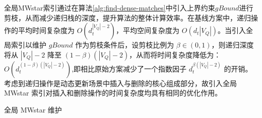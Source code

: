      全局MWstar索引通过在算法\ref{alg:find-dense-matches}中引入上界约束$gBound$进行剪枝，从而减少递归栈的深度，提升算法的整体计算效率。在基线方案中，递归操作的平均时间复杂度为 $O(d_t^{|V_Q|-2})$，平均空间复杂度为 $O(d_t|V_Q|)$。当引入全局索引以维护 $gBound$ 作为剪枝条件后，设剪枝比例为 $\beta \in (0,1)$，则递归深度将从 $|V_Q|-2$ 降至 $(1-\beta)(|V_Q|-2)$，从而将时间复杂度降低为：$O(d_{t}^{(1-\beta)(|V_Q|-2)})$,即相比原始方案减少了一个指数因子 $d_t^{\beta(|V_Q|-2)}$ 的开销。
     考虑到递归操作是动态更新场景中插入与删除的核心组成部分，故引入全局 MWstar 索引对插入和删除操作的时间复杂度均具有相同的优化作用。
     \begin{algorithm}[H]
        \small
        \caption{全局 MWstar 维护}
        \label{alg:base-mwstar:update}
      

\end{algorithm}
